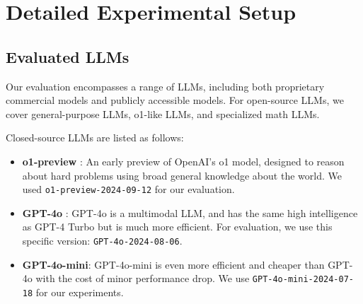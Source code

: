 \section{Detailed Experimental Setup}\label{app: exp_setup}
\subsection{Evaluated LLMs}\label{app:models}


Our evaluation encompasses a range of LLMs, including both proprietary commercial models and publicly accessible models. For open-source LLMs, we cover general-purpose LLMs, o1-like LLMs, and specialized math LLMs.

Closed-source LLMs are listed as follows:
\begin{itemize}
    \item \textbf{o1-preview} \citep{o1}: An early preview of OpenAI's o1 model, designed to reason about hard problems using broad general knowledge about the world. We used \texttt{o1-preview-2024-09-12} for our evaluation.
    \item \textbf{GPT-4o} \citep{gpt4o2024openai}: GPT-4o is a multimodal LLM, and has the same high intelligence as GPT-4 Turbo but is much more efficient. For evaluation, we use this specific version: \texttt{GPT-4o-2024-08-06}.
    \item \textbf{GPT-4o-mini}: GPT-4o-mini is even more efficient and cheaper than GPT-4o with the cost of minor performance drop. We use \texttt{GPT-4o-mini-2024-07-18} for our experiments.
\end{itemize}

